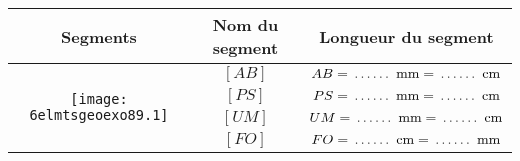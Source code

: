 \renewcommand{\arraystretch}{2.5}
  \begin{center}
    \begin{tabular}{|c|c|c|}
      \hline
      Segments&Nom du segment&Longueur du segment\\
      \hline
      \multirow{4}{9cm}{\texttt{[image: 6elmtsgeoexo89.1]}}&$[AB]$&$AB=\hbox to1cm{\dotfill}~\mbox{mm}=\hbox to1cm{\dotfill}~\mbox{cm}$\\
      \cline{2-3}
      &$[PS]$&$PS=\hbox to1cm{\dotfill}~\mbox{mm}=\hbox
      to1cm{\dotfill}~\mbox{cm}$\\
      \cline{2-3}
      &$[UM]$&$UM=\hbox to1cm{\dotfill}~\mbox{mm}=\hbox
      to1cm{\dotfill}~\mbox{cm}$\\
      \cline{2-3}
      &$[FO]$&$FO=\hbox to1cm{\dotfill}~\mbox{cm}=\hbox
      to1cm{\dotfill}~\mbox{mm}$\\
      \hline
    \end{tabular}
  \end{center}
\renewcommand{\arraystretch}{1}